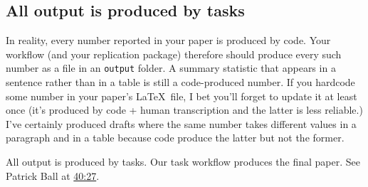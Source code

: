 \subsection{All output is produced by tasks}

In reality, every number reported in your paper is produced by code.
Your workflow (and your replication package) therefore should produce every such number as a file in an \texttt{output} folder.
A summary statistic that appears in a sentence rather than in a table is still a code-produced number.
If you hardcode some number in your paper's \LaTeX\ file, I bet you'll forget to update it at least once (it's produced by code + human transcription and the latter is less reliable.)
I've certainly produced drafts where the same number takes different values in a paragraph and in a table because code produce the latter but not the former.

All output is produced by tasks.
Our task workflow produces the final paper.
See Patrick Ball at \href{https://www.youtube.com/watch?v=ZSunU9GQdcI&t=40m27s}{40:27}.
